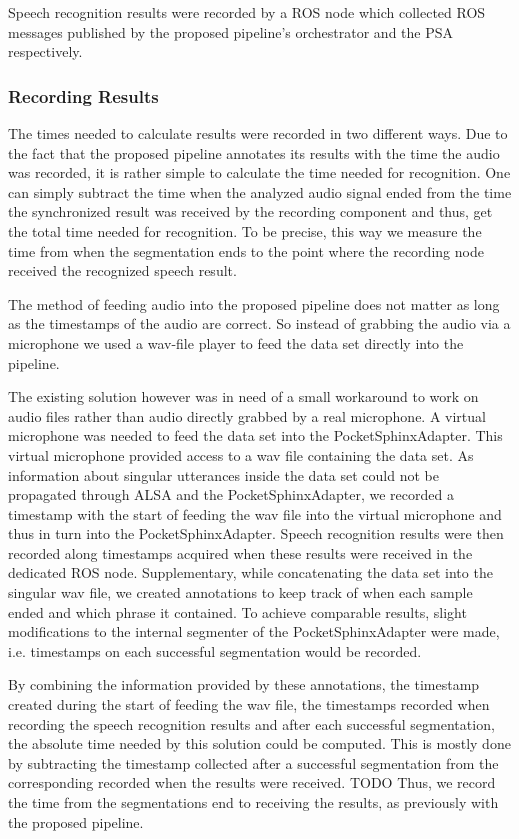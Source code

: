 Speech recognition results were recorded by a ROS node which collected ROS messages published by the proposed pipeline's orchestrator and the PSA respectively.

\subsubsection{Recording Results}

The times needed to calculate results were recorded in two different ways.
Due to the fact that the proposed pipeline annotates its results with the time the audio was recorded, it is rather simple to calculate the time needed for recognition.
One can simply subtract the time when the analyzed audio signal ended from the time the synchronized result was received by the recording component and thus, get the total time needed for recognition.
To be precise, this way we measure the time from when the segmentation ends to the point where the recording node received the recognized speech result.

The method of feeding audio into the proposed pipeline does not matter as long as the timestamps of the audio are correct.
So instead of grabbing the audio via a microphone we used a wav-file player to feed the data set directly into the pipeline.

The existing solution however was in need of a small workaround to work on audio files rather than audio directly grabbed by a real microphone.
A virtual microphone was needed to feed the data set into the PocketSphinxAdapter.
This virtual microphone provided access to a wav file containing the data set. 
As information about singular utterances inside the data set could not be propagated through ALSA and the PocketSphinxAdapter, we recorded a timestamp with the start of feeding the wav file into the virtual microphone and thus in turn into the PocketSphinxAdapter.
Speech recognition results were then recorded along timestamps acquired when these results were received in the dedicated ROS node.
Supplementary, while concatenating the data set into the singular wav file, we created annotations to keep track of when each sample ended and which phrase it contained.
To achieve comparable results, slight modifications to the internal segmenter of the PocketSphinxAdapter were made, i.e. timestamps on each successful segmentation would be recorded.

By combining the information provided by these annotations, the timestamp created during the start of feeding the wav file, the timestamps recorded when recording the speech recognition results and after each successful segmentation, the absolute time needed by this solution could be computed. 
This is mostly done by subtracting the timestamp collected after a successful segmentation from the corresponding recorded when the results were received. TODO
Thus, we record the time from the segmentations end to receiving the results, as previously with the proposed pipeline.

